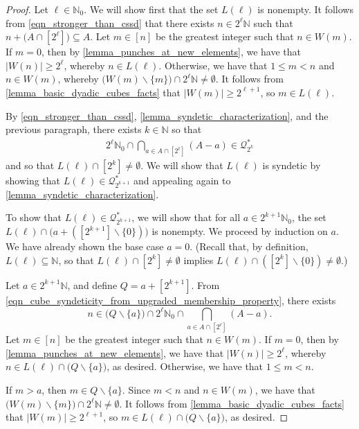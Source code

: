 \documentclass[letter,11pt]{article}
\theoremstyle{plain}
\theoremstyle{definition}
\theoremstyle{plain}
\theoremstyle{plain}
\numberwithin{equation}{section}
\newcommand{\N}{\mathbb{N}}
\renewcommand{\leq}{\leqslant}
\renewcommand{\geq}{\geqslant}
\renewcommand{\setminus}{\backslash}
\newcommand{\cubes}{\mathcal{Q}}
\begin{document}
\begin{proof}
    Let $\ell \in \N_0$. We will show first that the set $L(\ell)$ is nonempty.  It follows from \eqref{eqn_stronger_than_cssd} that there exists $n \in 2^\ell \N$ such that $n + \big(A \cap [2^\ell]\big) \subseteq A$.  Let $m \in [n]$ be the greatest integer such that $n \in W(m)$.  If $m=0$, then by \cref{lemma_punches_at_new_elements}, we have that $|W(n)| \geq 2^\ell$, whereby $n \in L(\ell)$.  Otherwise, we have that $1 \leq m < n$ and $n \in W(m)$, whereby $\big( W(m) \setminus \{m\} \big) \cap 2^\ell \N \neq \emptyset$.  It follows from \cref{lemma_basic_dyadic_cubes_facts} that $|W(m)| \geq 2^{\ell + 1}$, so $m \in L(\ell)$.

    By \eqref{eqn_stronger_than_cssd}, \cref{lemma_syndetic_characterization}, and the previous paragraph, there exists $k \in \N$ so that
    \begin{align}
    \label{eqn_cube_syndeticity_from_upgraded_membership_property}
        2^\ell \N_0 \cap \bigcap_{a \in A \cap [2^{\ell}]} (A-a) \in \cubes_{2^{k}}^*
    \end{align}
    and so that $L(\ell) \cap [2^k] \neq \emptyset$.  We will show that $L(\ell)$ is syndetic by showing that $L(\ell) \in \cubes_{2^{k+1}}^*$ and appealing again to \cref{lemma_syndetic_characterization}.

    To show that $L(\ell) \in \cubes_{2^{k+1}}^*$, we will show that for all $a \in 2^{k+1}\N_0$, the set $L(\ell) \cap \big(a + ([2^{k+1}]\setminus \{0\})\big)$ is nonempty.  We proceed by induction on $a$.  We have already shown the base case $a=0$. (Recall that, by definition, $L(\ell) \subseteq \N$, so that $L(\ell) \cap [2^k] \neq \emptyset$ implies $L(\ell) \cap ([2^k] \setminus \{0\}) \neq \emptyset$.)

    Let $a \in 2^{k+1}\N$, and define $Q = a + [2^{k+1}]$.  From \eqref{eqn_cube_syndeticity_from_upgraded_membership_property}, there exists
    \[n \in \big( Q \setminus \{a\} \big) \cap 2^\ell \N_0 \cap \bigcap_{a \in A \cap [2^{\ell}]} (A-a).\]
    Let $m \in [n]$ be the greatest integer such that $n \in W(m)$.  If $m=0$, then by \cref{lemma_punches_at_new_elements}, we have that $|W(n)| \geq 2^\ell$, whereby $n \in L(\ell) \cap \big( Q \setminus \{a\} \big)$, as desired. Otherwise, we have that $1 \leq m < n$.

    If $m > a$, then $m \in Q \setminus \{a\}$.  Since $m < n$ and $n \in W(m)$, we have that $\big( W(m) \setminus \{m\} \big) \cap 2^\ell \N \neq \emptyset$.  It follows from \cref{lemma_basic_dyadic_cubes_facts} that $|W(m)| \geq 2^{\ell + 1}$, so $m \in L(\ell) \cap \big( Q \setminus \{a\} \big)$, as desired.


\end{proof}
\end{document}
